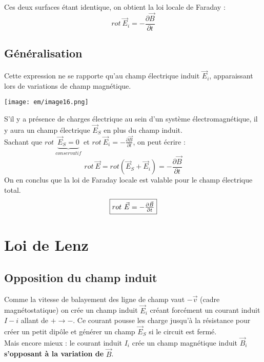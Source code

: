 \documentclass[british,french,11pt, a4paper, openany]{book}
\begin{document}
Ces deux surfaces étant identique, on obtient la loi locale de Faraday :
\begin{equation}
	rot\ \vec{E}_i = -\frac{\partial \vec{B}}{\partial t}
\end{equation}

\subsection{Généralisation}
Cette expression ne se rapporte qu'au champ électrique induit $\vec{E}_i$, apparaissant lors de variations de champ magnétique. 
\begin{center}
	\texttt{[image: em/image16.png]}\\
\end{center}
S'il y a présence de charges électrique au sein d'un système électromagnétique, il y aura un champ électrique $\vec{E}_S$ en plus du champ induit.\\
Sachant que $rot\ \underbrace{\vec{E}_S = 0}_{conservatif}$ et $rot\ \vec{E}_i = -\frac{\partial \vec{B}}{\partial t}$, on peut écrire :
\begin{equation}
	rot\ \vec{E} = rot(\vec{E}_S + \vec{E}_i) = -\frac{\partial \vec{B}}{\partial t}
\end{equation}
On en conclus que la loi de Faraday locale est valable pour le champ électrique total.
\begin{equation}
	\fbox{$rot\ \vec{E} = -\frac{\partial \vec{B}}{\partial t}$}
\end{equation}

\section{Loi de Lenz}
\subsection{Opposition du champ induit}
Comme la vitesse de balayement des ligne de champ vaut $-\vec{v}$ (cadre magnétostatique) on crée un champ induit $\vec{E}_i$ créant forcément un courant induit $I-i$ allant de $+ \rightarrow -$. Ce courant pousse les charge jusqu'à la résistance pour créer un petit dipôle et générer un champ $\vec{E}_S$ si le circuit est fermé.\\
Mais encore mieux : le courant induit $I_i$ crée un champ magnétique induit $\vec{B}_i$ \textbf{s'opposant à la variation de }$\vec{B}$.
\end{document}
